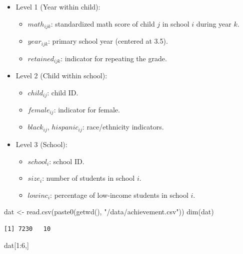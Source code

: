 \documentclass[
  letterpaper,
  DIV=11,
  numbers=noendperiod]{scrreprt}
\newenvironment{Shaded}{\begin{snugshade}}{\end{snugshade}}
\newcommand{\DecValTok}[1]{\textcolor[rgb]{0.68,0.00,0.00}{#1}}
\newcommand{\FunctionTok}[1]{\textcolor[rgb]{0.28,0.35,0.67}{#1}}
\newcommand{\NormalTok}[1]{\textcolor[rgb]{0.00,0.23,0.31}{#1}}
\newcommand{\OtherTok}[1]{\textcolor[rgb]{0.00,0.23,0.31}{#1}}
\newcommand{\SpecialCharTok}[1]{\textcolor[rgb]{0.37,0.37,0.37}{#1}}
\newcommand{\StringTok}[1]{\textcolor[rgb]{0.13,0.47,0.30}{#1}}
\providecommand{\tightlist}{%
  \setlength{\itemsep}{0pt}\setlength{\parskip}{0pt}}\usepackage{longtable,booktabs,array}
\begin{document}
\begin{itemize}
\item
  Level 1 (Year within child):

  \begin{itemize}
  \tightlist
  \item
    \(math_{ijk}\): standardized math score of child \(j\) in school
    \(i\) during year \(k\).
  \item
    \(year_{ijk}\): primary school year (centered at 3.5).
  \item
    \(retained_{ijk}\): indicator for repeating the grade.
  \end{itemize}
\item
  Level 2 (Child within school):

  \begin{itemize}
  \tightlist
  \item
    \(child_{ij}\): child ID.
  \item
    \(female_{ij}\): indicator for female.
  \item
    \(black_{ij}\), \(hispanic_{ij}\): race/ethnicity indicators.
  \end{itemize}
\item
  Level 3 (School):

  \begin{itemize}
  \tightlist
  \item
    \(school_i\): school ID.
  \item
    \(size_i\): number of students in school \(i\).
  \item
    \(lowinc_i\): percentage of low-income students in school \(i\).
  \end{itemize}
\end{itemize}

\begin{Shaded}
\begin{Highlighting}[]
\NormalTok{dat }\OtherTok{\textless{}{-}} \FunctionTok{read.csv}\NormalTok{(}\FunctionTok{paste0}\NormalTok{(}\FunctionTok{getwd}\NormalTok{(), }\StringTok{"/data/achievement.csv"}\NormalTok{))}
\FunctionTok{dim}\NormalTok{(dat)}
\end{Highlighting}
\end{Shaded}

\begin{verbatim}
[1] 7230   10
\end{verbatim}

\begin{Shaded}
\begin{Highlighting}[]
\NormalTok{dat[}\DecValTok{1}\SpecialCharTok{:}\DecValTok{6}\NormalTok{,]}
\end{Highlighting}
\end{Shaded}
\end{document}
